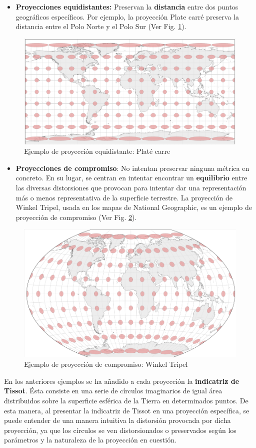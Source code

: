 \documentclass[
]{book}
\providecommand{\tightlist}{%
  \setlength{\itemsep}{0pt}\setlength{\parskip}{0pt}}
\theoremstyle{definition}
\theoremstyle{definition}
\theoremstyle{definition}
\theoremstyle{definition}
\theoremstyle{remark}
\begin{document}
\begin{itemize}
\tightlist
\item
  \textbf{Proyecciones equidistantes:} Preservan la \textbf{distancia} entre dos puntos
  geográficos específicos. Por ejemplo, la proyección Plate carré preserva la
  distancia entre el Polo Norte y el Polo Sur (Ver Fig. \ref{fig:equidist}).
\end{itemize}

\begin{figure}

{\centering \includegraphics[width=0.3\linewidth]{img/equidist} 

}

\caption{Ejemplo de proyección equidistante: Platé carre}\label{fig:equidist}
\end{figure}

\begin{itemize}
\tightlist
\item
  \textbf{Proyecciones de compromiso}: No intentan preservar ninguna métrica en
  concreto. En su lugar, se centran en intentar encontrar un \textbf{equilibrio}
  entre las diversas distorsiones que provocan para intentar dar una
  representación más o menos representativa de la superficie terrestre. La
  proyección de Winkel Tripel, usada en los mapas de National Geographic, es
  un ejemplo de proyección de compromiso (Ver Fig. \ref{fig:comp}).
\end{itemize}

\begin{figure}

{\centering \includegraphics[width=0.3\linewidth]{img/comp} 

}

\caption{Ejemplo de proyección de compromiso: Winkel Tripel}\label{fig:comp}
\end{figure}

En los anteriores ejemplos se ha añadido a cada proyección la \textbf{indicatriz de
Tissot}. Ésta consiste en una serie de círculos imaginarios de igual área
distribuidos sobre la superficie esférica de la Tierra en determinados puntos.
De esta manera, al presentar la indicatriz de Tissot en una proyección
específica, se puede entender de una manera intuitiva la distorsión provocada
por dicha proyección, ya que los círculos se ven distorsionados o preservados
según los parámetros y la naturaleza de la proyección en cuestión.

\backmatter
\printindex

  
\end{document}
